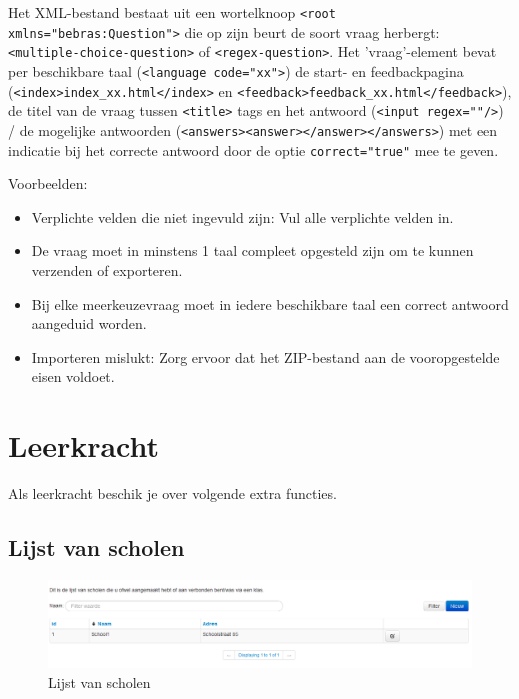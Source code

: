 \documentclass[]{article}
\begin{document}
Het XML-bestand bestaat uit een wortelknoop \verb+<root xmlns="bebras:Question">+ 
die op zijn beurt de soort vraag herbergt: \verb+<multiple-choice-question>+ of \verb+<regex-question>+.
Het 'vraag'-element bevat per beschikbare taal (\verb+<language code="xx">+) 
de start- en feedbackpagina (\verb+<index>index_xx.html</index>+ en \verb+<feedback>feedback_xx.html</feedback>+), 
de titel van de vraag tussen \verb+<title>+ tags 
en het antwoord (\verb+<input regex=""/>+) / de mogelijke antwoorden (\verb+<answers><answer></answer></answers>+)
met een indicatie bij het correcte antwoord door de optie \verb+correct="true"+ mee te geven.

Voorbeelden:

 

\begin{itemize}
\item Verplichte velden die niet ingevuld zijn: Vul alle verplichte velden in.
\item De vraag moet in minstens 1 taal compleet opgesteld zijn om te kunnen verzenden of exporteren.
\item Bij elke meerkeuzevraag moet in iedere beschikbare taal een correct antwoord aangeduid worden.
\item Importeren mislukt: Zorg ervoor dat het ZIP-bestand aan de vooropgestelde eisen voldoet.
\end{itemize}

\section{Leerkracht}

Als leerkracht beschik je over volgende extra functies.

\subsection{Lijst van scholen}

\begin{figure}[!ht]
	\centering
	\includegraphics[width=1\textwidth]{img/schools}
	\caption{Lijst van scholen}
	\label{schools}
\end{figure}
\end{document}
